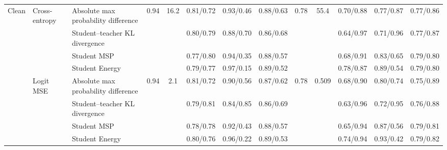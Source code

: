 \documentclass[border=2pt]{standalone}
\begin{document}
\begin{tabular}{lllcccccccccc}
\midrule
Clean & Cross-entropy & Absolute max probability difference & 0.94 & 16.2 & 0.81/0.72 & 0.93/0.46 & 0.88/0.63 & 0.78 & 55.4 & 0.70/0.88 & 0.77/0.87 & 0.77/0.86 \\
 &  & Student--teacher KL divergence &  &  & 0.80/0.79 & 0.88/0.70 & 0.86/0.68 &  &  & 0.64/0.97 & 0.71/0.96 & 0.77/0.87 \\
 &  & Student MSP &  &  & 0.77/0.80 & 0.94/0.35 & 0.88/0.57 &  &  & 0.68/0.91 & 0.83/0.65 & 0.79/0.80 \\
 &  & Student Energy &  &  & 0.79/0.77 & 0.97/0.15 & 0.89/0.52 &  &  & 0.78/0.87 & 0.89/0.54 & 0.79/0.80 \\
\addlinespace
 & Logit MSE & Absolute max probability difference & 0.94 & 2.1 & 0.81/0.72 & 0.90/0.56 & 0.87/0.62 & 0.78 & 0.509 & 0.68/0.90 & 0.80/0.74 & 0.75/0.89 \\
 &  & Student--teacher KL divergence &  &  & 0.79/0.81 & 0.84/0.85 & 0.86/0.69 &  &  & 0.63/0.96 & 0.72/0.95 & 0.76/0.88 \\
 &  & Student MSP &  &  & 0.78/0.78 & 0.92/0.43 & 0.88/0.57 &  &  & 0.65/0.94 & 0.87/0.56 & 0.79/0.81 \\
 &  & Student Energy &  &  & 0.80/0.76 & 0.96/0.22 & 0.89/0.53 &  &  & 0.74/0.94 & 0.93/0.42 & 0.79/0.82 \\
\bottomrule
\end{tabular}
\end{document}
